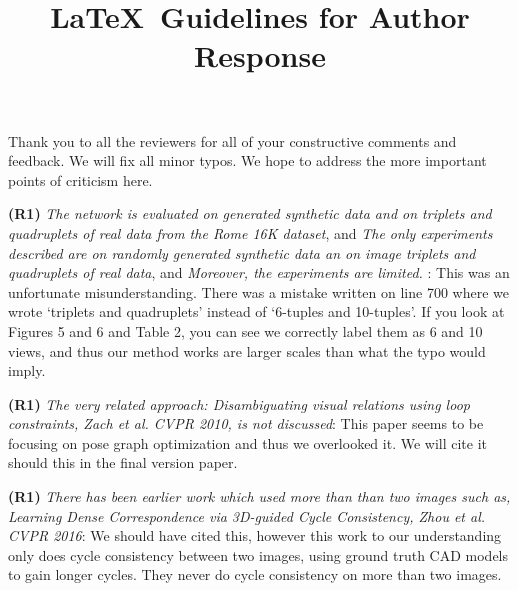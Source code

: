\documentclass[10pt,twocolumn,letterpaper]{article}
\begin{document}
\title{\LaTeX\ Guidelines for Author Response}  %

\maketitle
\thispagestyle{empty}


Thank you to all the reviewers for all of your constructive comments and feedback.
We will fix all minor typos. 
We hope to address the more important points of criticism here.


\textbf{(R1)}
\textit{The network is evaluated on generated synthetic data and on triplets and quadruplets of real data from the Rome 16K dataset}, and
\textit{The only experiments described are on randomly generated synthetic data an on image triplets and quadruplets of real data}, and
\textit{Moreover, the experiments are limited.}
:
This was an unfortunate misunderstanding.
There was a mistake written on line 700 where we wrote `triplets and quadruplets' instead of `6-tuples and 10-tuples'.
If you look at Figures 5 and 6 and Table 2, you can see we correctly label them as 6 and 10 views, and thus our method works are larger scales than what the typo would imply.

\textbf{(R1)} \textit{The very related approach: Disambiguating visual relations using loop constraints, Zach et al. CVPR 2010, is not discussed}:
This paper seems to be focusing on pose graph optimization and thus we overlooked it.
We will cite it should this in the final version paper.

\textbf{(R1)} \textit{There has been earlier work which used more than than two images such as, Learning Dense Correspondence via 3D-guided Cycle Consistency, Zhou et al. CVPR 2016}:
We should have cited this, however this work \cite{zhou2016learning} to our understanding only does cycle consistency between two images, using ground truth CAD models to gain longer cycles.
They never do cycle consistency on more than two images. 
\end{document}
